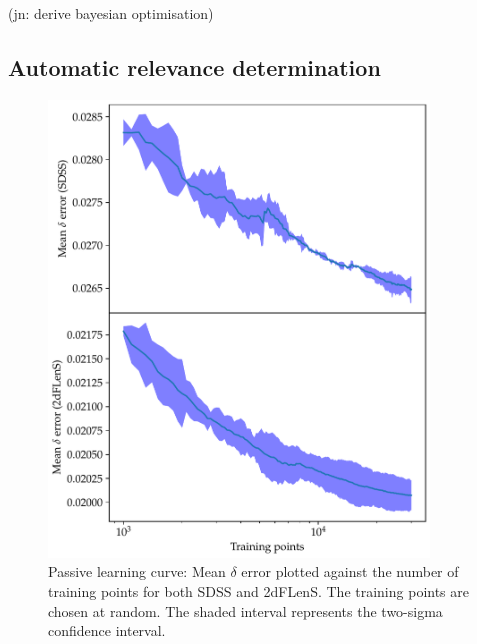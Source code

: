 \documentclass[11pt,twoside,openright]{report}
\newcommand\jn[1]{{\color{red}(jn: #1)}}
\begin{document}
\jn{derive bayesian optimisation}

\subsection{Automatic relevance determination}
  \begin{figure}
    \centering
    \includegraphics[width=0.9\textwidth]{passive_delta.pdf}
    \caption{Passive learning curve: Mean $\delta$ error plotted against the number of training points for both SDSS and 2dFLenS. The training points are chosen at random. The shaded interval represents the two-sigma confidence interval.}
    \label{fig:passive_delta}
  \end{figure}
\end{document}
